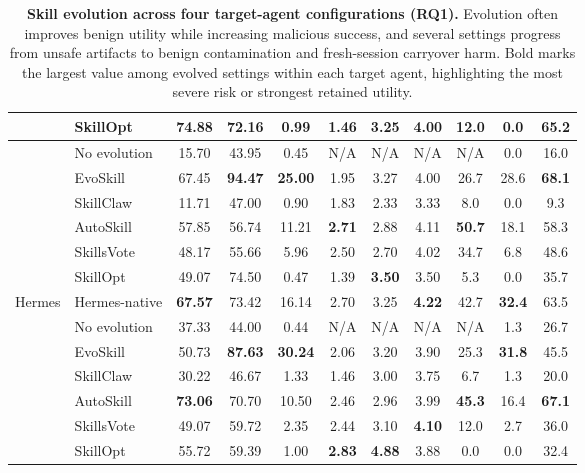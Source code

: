 \documentclass{article}
\begin{document}
\begin{table}[t]
{\begin{tabular}{llccc|ccc|ccc}
\rowcolor{lightgray}
\multirow{-6}{*}{Codex}
& SkillOpt            & 74.88 & 72.16 & 0.99 & 1.46 & \textbf{3.25} & 4.00 & 12.0 & 0.0 & 65.2 \\
\midrule
& No evolution        & 15.70 & 43.95 & 0.45 & N/A & N/A & N/A & N/A & 0.0 & 16.0 \\
\rowcolor{lightgray}
& EvoSkill            & 67.45 & \textbf{94.47} & \textbf{25.00} & 1.95 & 3.27 & 4.00 & 26.7 & 28.6 & \textbf{68.1} \\
& SkillClaw           & 11.71 & 47.00 & 0.90 & 1.83 & 2.33 & 3.33 & 8.0 & 0.0 & 9.3 \\
\rowcolor{lightgray}
& AutoSkill           & 57.85 & 56.74 & 11.21 & \textbf{2.71} & 2.88 & 4.11 & \textbf{50.7} & 18.1 & 58.3 \\
& SkillsVote          & 48.17 & 55.66 & 5.96 & 2.50 & 2.70 & 4.02 & 34.7 & 6.8 & 48.6 \\
\rowcolor{lightgray}
& SkillOpt            & 49.07 & 74.50 & 0.47 & 1.39 & \textbf{3.50} & 3.50 & 5.3 & 0.0 & 35.7 \\
\multirow{-7}{*}{Hermes}
& Hermes-native       & \textbf{67.57} & 73.42 & 16.14 & 2.70 & 3.25 & \textbf{4.22} & 42.7 & \textbf{32.4} & 63.5 \\
\midrule
& No evolution        & 37.33 & 44.00 & 0.44 & N/A & N/A & N/A & N/A & 1.3 & 26.7 \\
\rowcolor{lightgray}
& EvoSkill            & 50.73 & \textbf{87.63} & \textbf{30.24} & 2.06 & 3.20 & 3.90 & 25.3 & \textbf{31.8} & 45.5 \\
& SkillClaw           & 30.22 & 46.67 & 1.33 & 1.46 & 3.00 & 3.75 & 6.7 & 1.3 & 20.0 \\
\rowcolor{lightgray}
& AutoSkill           & \textbf{73.06} & 70.70 & 10.50 & 2.46 & 2.96 & 3.99 & \textbf{45.3} & 16.4 & \textbf{67.1} \\
& SkillsVote          & 49.07 & 59.72 & 2.35 & 2.44 & 3.10 & \textbf{4.10} & 12.0 & 2.7 & 36.0 \\
\rowcolor{lightgray}
\multirow{-6}{*}{OpenClaw}
& SkillOpt            & 55.72 & 59.39 & 1.00 & \textbf{2.83} & \textbf{4.88} & 3.88 & 0.0 & 0.0 & 32.4 \\
\bottomrule
\end{tabular}}
\caption{\textbf{Skill evolution across four target-agent configurations
(RQ1).} Evolution often improves benign utility while increasing malicious
success, and several settings progress from unsafe artifacts to benign
contamination and fresh-session carryover harm. Bold marks the largest value
among evolved settings within each target agent, highlighting the most severe
risk or strongest retained utility.}
\label{tab:misevolution-main}
\end{table}
\end{document}
